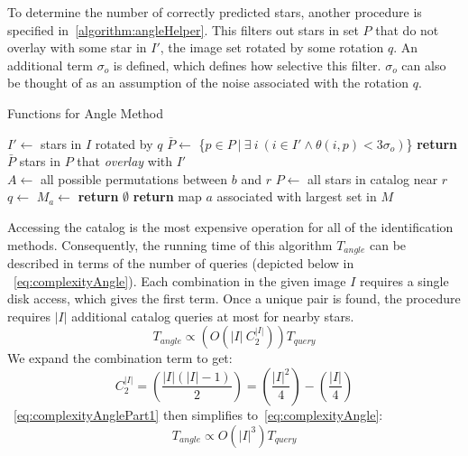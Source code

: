 To determine the number of correctly predicted stars, another procedure is specified in~\autoref{algorithm:angleHelper}.
This filters out stars in set $P$ that do not overlay with some star in $I'$, the image set rotated by some rotation
$q$.
An additional term $\sigma_o$ is defined, which defines how selective this filter.
$\sigma_o$ can also be thought of as an assumption of the noise associated with the rotation $q$.

\begin{algorithm}
    \caption{Functions for Angle Method}\label{algorithm:angleHelper}
    \begin{algorithmic}[1]
        \State $I' \gets$ stars in $I$ rotated by $q$
        \State $\bar{P} \gets $ \{$p \in P \ | \ \exists \ i \ (i \in I' \land \theta (i, p) < 3\sigma_o)$\}
        \State \textbf{return} $\bar{P}$ \Comment stars in $P$ that \textit{overlay} with $I'$
        \EndFunction
        \\
        \State $A \gets $ all possible permutations between $b$ and $r$
        \State $P \gets $ all stars in catalog near $r$
        \\
        \State $q \gets $ 
        \State $M_a \gets $ 
        \EndFor
        \State \textbf{return} $\emptyset$
        \Else
        \State \textbf{return} map $a$ associated with largest set in $M$
        \EndIf
        \EndFunction
    \end{algorithmic}
\end{algorithm}

Accessing the catalog is the most expensive operation for all of the identification methods.
Consequently, the running time of this algorithm $T_{angle}$ can be described in terms of the number of queries
(depicted below in ~\autoref{eq:complexityAngle}).
Each combination in the given image $I$ requires a single disk access, which gives the first term.
Once a unique pair is found, the  procedure requires $|I|$ additional catalog queries at most for nearby
stars.
\begin{equation}\label{eq:complexityAnglePart1}
    T_{angle} \propto \left( O\left( |I| \ C^{|I|}_2 \right)  \right) T_{query}
\end{equation}
We expand the combination term to get:
\begin{equation}
    C^{|I|}_2 = \left(\frac{|I|\left( |I| - 1 \right)}{2}\right) = \left(\frac{|I|^2}{4}\right)-
    \left(\frac{|I|}{4}\right)
\end{equation}
~\autoref{eq:complexityAnglePart1} then simplifies to~\autoref{eq:complexityAngle}:
\begin{equation}\label{eq:complexityAngle}
    T_{angle} \propto O\left( |I|^3 \right) T_{query}
\end{equation}

